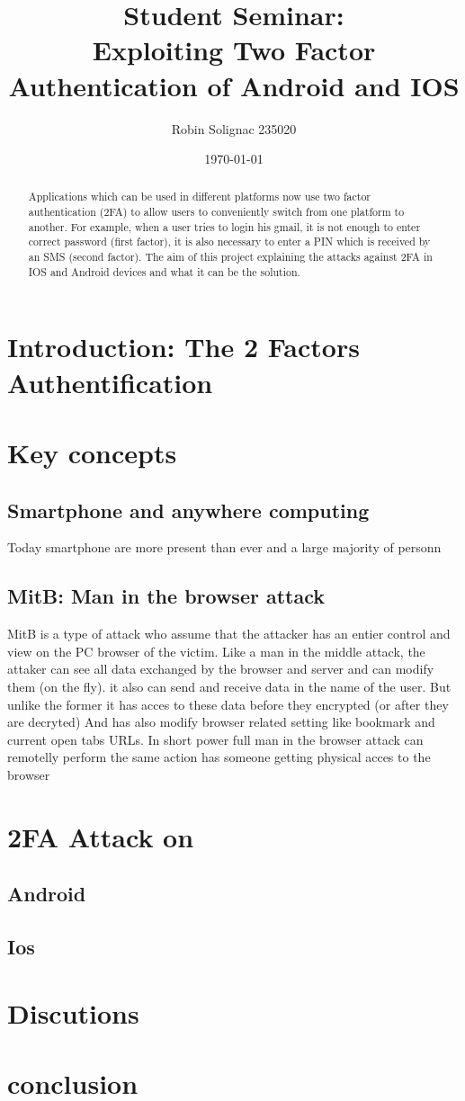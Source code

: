 \documentclass[11pt]{article}
\title{Student Seminar: \\Exploiting Two Factor Authentication of Android and IOS}
\author{Robin Solignac 235020}
\date{\today}
\begin{document}
\maketitle
\begin{abstract}
  Applications  which  can  be  used  in  different  platforms  now  use  two
factor authentication (2FA) to allow users to conveniently switch from one platform to another.
For example, when a user tries to login his gmail, it is not enough to enter correct password (first
factor), it is also necessary to enter a PIN which is received by an SMS (second factor).  The aim
of this project explaining the attacks against 2FA in IOS and Android devices and what it can
be the solution. 
\end{abstract}
\section{Introduction: The 2 Factors Authentification}

\section{Key concepts}
\subsection{Smartphone and anywhere computing}
Today smartphone are more present than ever and a large majority of personn
\subsection{MitB: Man in the browser attack}
MitB is a type of attack who assume that the attacker has an entier control and 
view on the PC browser of the victim. Like a man in the middle attack, the attaker can see all data 
exchanged by the browser and server and can modify them (on the fly). it also can send and receive 
data in the name of the user. 
But unlike the former it has acces to these data before they encrypted (or after they are decryted) 
And has also modify browser related setting like bookmark and current open tabs 
URLs. In short power full man in the browser attack can remotelly perform the same action 
has someone getting physical acces to the browser
\paragraph{}

\section{2FA Attack on }
\subsection{Android}
\subsection{Ios}
\section{Discutions} 
\section{conclusion}
\end{document}
